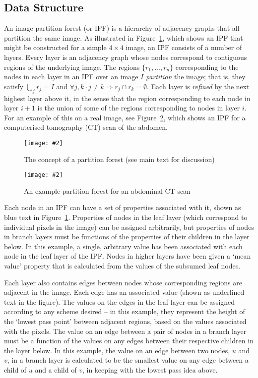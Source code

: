 \documentclass[a4paper]{article}
\newcommand{\stufigex}[5]					%
{
	\begin{figure}[#5]
	\begin{center}
		\texttt{[image: \#2]}
		\caption{#3}
		\label{#4}
	\end{center}
	\end{figure}
}
\begin{document}
\subsection{Data Structure}

An image partition forest (or IPF) is a hierarchy of adjacency graphs that all partition the same image. As illustrated in Figure~\ref{fig:ipfs-concept}, which shows an IPF that might be constructed for a simple $4 \times 4$ image, an IPF consists of a number of layers. Every layer is an adjacency graph whose nodes correspond to contiguous regions of the underlying image. The regions $\{r_1,...,r_n\}$ corresponding to the nodes in each layer in an IPF over an image $I$ \emph{partition} the image; that is, they satisfy $\bigcup_j r_j = I$ and $\forall j, k \cdot j \ne k \Rightarrow r_j \cap r_k = \emptyset$. Each layer is \emph{refined} by the next highest layer above it, in the sense that the region corresponding to each node in layer $i + 1$ is the union of some of the regions corresponding to nodes in layer $i$. For an example of this on a real image, see Figure~\ref{fig:ipfs-ctconcept}, which shows an IPF for a computerised tomography (CT) scan of the abdomen.

\stufigex{height=19cm}{ipfs-concept.png}{The concept of a partition forest (see main text for discussion)}{fig:ipfs-concept}{p}

\stufigex{height=19cm}{ipfs-ctconcept.png}{An example partition forest for an abdominal CT scan}{fig:ipfs-ctconcept}{p}

Each node in an IPF can have a set of properties associated with it, shown as blue text in Figure~\ref{fig:ipfs-concept}. Properties of nodes in the leaf layer (which correspond to individual pixels in the image) can be assigned arbitrarily, but properties of nodes in branch layers must be functions of the properties of their children in the layer below. In this example, a single, arbitrary value has been associated with each node in the leaf layer of the IPF. Nodes in higher layers have been given a `mean value' property that is calculated from the values of the subsumed leaf nodes.

Each layer also contains edges between nodes whose corresponding regions are adjacent in the image. Each edge has an associated value (shown as underlined text in the figure). The values on the edges in the leaf layer can be assigned according to any scheme desired -- in this example, they represent the height of the `lowest pass point' between adjacent regions, based on the values associated with the pixels. The value on an edge between a pair of nodes in a branch layer must be a function of the values on any edges between their respective children in the layer below. In this example, the value on an edge between two nodes, $u$ and $v$, in a branch layer is calculated to be the smallest value on any edge between a child of $u$ and a child of $v$, in keeping with the lowest pass idea above.
\end{document}
